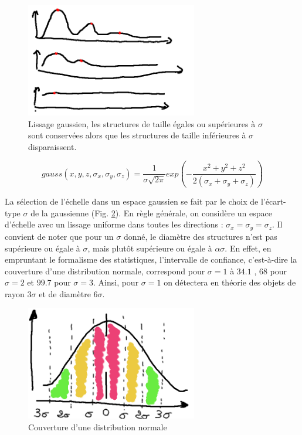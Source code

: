   \begin{figure}[!ht]
    \centering
    \includegraphics[height=5cm]{Images/gaussian_smoothing.png}
    \caption{Lissage gaussien, les structures de taille égales ou supérieures à $\sigma$ sont conservées alors que les structures de taille inférieures à $\sigma$ disparaissent.}
    \label{fig:gaussian_smoothing}
  \end{figure}
  
  \begin{equation}
    gauss(x,y,z,\sigma_{x},\sigma_{y},\sigma_{z}) = \frac{1}{ \sigma\sqrt{2\pi} }exp(-\frac{x^2 + y^2 + z^2}{2(\sigma_{x}+ \sigma_{y}+ \sigma_{z}) })
    \label{eq:Gaussienne 3D}
  \end{equation}
  
  La sélection de l'échelle dans un espace gaussien se fait par le choix de l'écart-type $\sigma$ de la gaussienne (Fig. \ref{fig:normal_distribution_probability_coverage}). En règle générale, on considère un espace d'échelle avec un lissage uniforme dans toutes les directions : $\sigma_x = \sigma_y = \sigma_z$. Il convient de noter que pour un $\sigma$ donné, le diamètre des structures n'est pas supérieure ou égale à $\sigma$, mais plutôt supérieure ou égale à $\alpha\sigma$. En effet, en empruntant le formalisme des statistiques, l'intervalle de confiance, c'est-à-dire la couverture d'une distribution normale, correspond pour $\sigma=1$ à $34.1$ \percent, $68$ \percent pour $\sigma=2$ et $99.7$ \percent pour $\sigma=3$. Ainsi, pour $\sigma=1$ on détectera en théorie des objets de rayon $3\sigma$ et de diamètre $6\sigma$.  
  
  \begin{figure}[!ht]
    \centering
    \includegraphics[height=5cm]{Images/normal_distribution_probability_coverage.png}
    \caption{Couverture d'une distribution normale}
    \label{fig:normal_distribution_probability_coverage}
  \end{figure}
  
